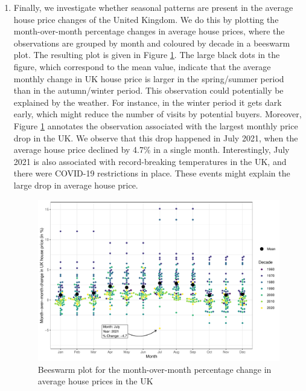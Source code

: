 \documentclass[a4paper,11pt]{article}\usepackage[]{graphicx}\usepackage[]{xcolor}
\newenvironment{knitrout}{}{} %
\begin{document}
\begin{enumerate}
\item Finally, we investigate whether seasonal patterns are present in the average house price changes of the United Kingdom. We do this by plotting the month-over-month percentage changes in average house prices, where the observations are grouped by month and coloured by decade in a beeswarm plot. The resulting plot is given in Figure \ref{fig:plot_beeswarm}. The large black dots in the figure, which correspond to the mean value, indicate that the average monthly change in UK house price is larger in the spring/summer period than in the autumn/winter period. This observation could potentially be explained by the weather. For instance, in the winter period it gets dark early, which might reduce the number of visits by potential buyers. Moreover, Figure \ref{fig:plot_beeswarm} annotates the observation associated with the largest monthly price drop in the UK. We observe that this drop happened in July 2021, when the average house price declined by 4.7\% in a single month. Interestingly, July 2021 is also associated with record-breaking temperatures in the UK, and there were COVID-19 restrictions in place. These events might explain the large drop in average house price. 

\begin{knitrout}
\color{fgcolor}\begin{figure}[H]

{\centering \includegraphics[width=1\linewidth]{figure/plot_beeswarm-1} 

}

\caption[Beeswarm plot for the month-over-month percentage change in average house prices in the UK]{Beeswarm plot for the month-over-month percentage change in average house prices in the UK}\label{fig:plot_beeswarm}
\end{figure}

\end{knitrout}




\end{enumerate}
\end{document}
